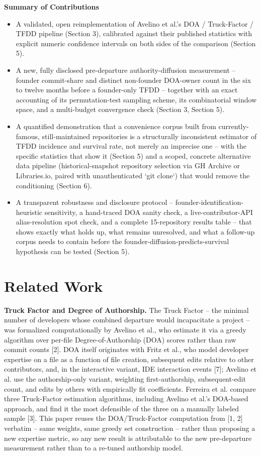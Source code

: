 \documentclass[11pt,letterpaper]{article}
\begin{document}
\textbf{Summary of Contributions}

\begin{itemize}
\item A validated, open reimplementation of Avelino et al.'s DOA / Truck-Factor / TFDD pipeline (Section 3), calibrated against their published statistics with explicit numeric confidence intervals on both sides of the comparison (Section 5).
\item A new, fully disclosed pre-departure authority-diffusion measurement -- founder commit-share and distinct non-founder DOA-owner count in the six to twelve months before a founder-only TFDD -- together with an exact accounting of its permutation-test sampling scheme, its combinatorial window space, and a multi-budget convergence check (Section 3, Section 5).
\item A quantified demonstration that a convenience corpus built from currently-famous, still-maintained repositories is a structurally inconsistent estimator of TFDD incidence and survival rate, not merely an imprecise one -- with the specific statistics that show it (Section 5) and a scoped, concrete alternative data pipeline (historical-snapshot repository selection via GH Archive or Libraries.io, paired with unauthenticated `git clone`) that would remove the conditioning (Section 6).
\item A transparent robustness and disclosure protocol -- founder-identification-heuristic sensitivity, a hand-traced DOA sanity check, a live-contributor-API alias-resolution spot check, and a complete 15-repository results table -- that shows exactly what holds up, what remains unresolved, and what a follow-up corpus needs to contain before the founder-diffusion-predicts-survival hypothesis can be tested (Section 5).
\end{itemize}

\section{Related Work}

\textbf{Truck Factor and Degree of Authorship.} The Truck Factor -- the minimal number of developers whose combined departure would incapacitate a project -- was formalized computationally by Avelino et al., who estimate it via a greedy algorithm over per-file Degree-of-Authorship (DOA) scores rather than raw commit counts [2]. DOA itself originates with Fritz et al., who model developer expertise on a file as a function of file creation, subsequent edits relative to other contributors, and, in the interactive variant, IDE interaction events [7]; Avelino et al. use the authorship-only variant, weighting first-authorship, subsequent-edit count, and edits by others with empirically fit coefficients. Ferreira et al. compare three Truck-Factor estimation algorithms, including Avelino et al.'s DOA-based approach, and find it the most defensible of the three on a manually labeled sample [3]. This paper reuses the DOA/Truck-Factor computation from [1, 2] verbatim -- same weights, same greedy set construction -- rather than proposing a new expertise metric, so any new result is attributable to the new pre-departure measurement rather than to a re-tuned authorship model.
\end{document}
